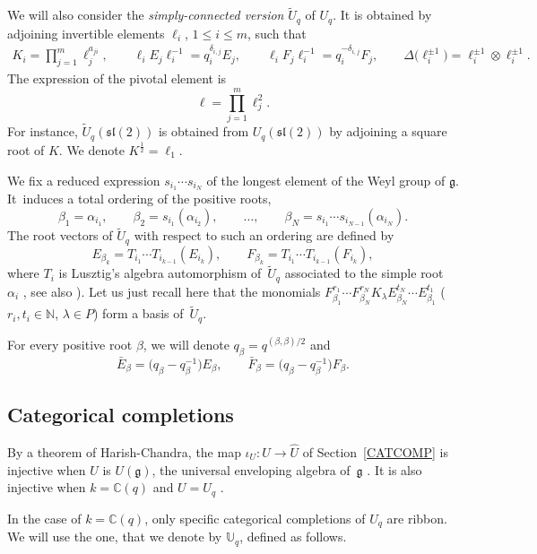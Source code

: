 \documentclass[pdftex]{sigma}%
\numberwithin{equation}{section}
\numberwithin{figure}{section}
\newcommand{\mUq}{\mathbb{U}_q}
\newcommand{\mn}{\mathbb{N}}
\begin{document}
We will also consider the {\it simply-connected version} $\tilde U_q$ of $U_q$. It is obtained by adjoining invertible elements $\ell_i$, $1\leq i \leq m$, such that
\begin{gather*}
K_i = \prod_{j=1}^m \ell_j^{a_{ji}} ,\qquad \ell_iE_j\ell_i^{-1}=q_i^{\delta_{i,j}}E_j ,\qquad \ell_iF_j\ell_i^{-1}=q_i^{-\delta_{i,j}}F_j ,\qquad \Delta\big(\ell_i^{\pm 1}\big)=\ell_i^{\pm 1}\otimes \ell_i^{\pm 1}.
\end{gather*}
The expression of the pivotal element is
\[ \ell=\prod_{j=1}^m \ell_j^2.\]
For instance, $\tilde U_q({\mathfrak{sl}}(2))$ is obtained from $U_q({\mathfrak{sl}}(2))$ by adjoining a square root of $K$. We denote $K^{\frac{1}{2}}=\ell_1$.

We fix a reduced expression $s_{i_1}\cdots s_{i_N}$ of the longest element of the Weyl group of $\mathfrak{g}$. It~indu\-ces a total ordering of the positive roots,
\[\beta_1 = \alpha_{i_1}, \qquad \beta_2 = s_{i_1}(\alpha_{i_2}), \qquad \dots, \qquad \beta_N = s_{i_1}\cdots s_{i_{N-1}}(\alpha_{i_N}).\]
The root vectors of $\tilde U_q$ with respect to such an ordering are defined by
\[E_{\beta_k} = T_{i_1}\cdots T_{i_{k-1}}(E_{i_k}) ,\qquad F_{\beta_k} = T_{i_1}\cdots T_{i_{k-1}}(F_{i_k}), \]
where $T_i$ is Lusztig's algebra automorphism of~$\tilde U_q$ associated to the simple root $\alpha_i$ \cite{Lusztig2, Lusztig}, see also \cite[Chapter~8]{CP}). Let us just recall here that the monomials $F_{\beta_1}^{r_1}\cdots F_{\beta_N}^{r_N}K_\lambda E_{\beta_N}^{t_N}\cdots E_{\beta_1}^{t_1}$ ($r_i,t_i\in \mn$, $\lambda\in P$) form a basis of~$\tilde U_q$.

For every positive root $\beta$, we will denote $q_\beta = q^{(\beta,\beta)/2}$ and
\[\bar{E}_\beta = \big(q_\beta-q_\beta^{-1}\big)E_\beta ,\qquad \bar{F}_\beta = \big(q_\beta-q_\beta^{-1}\big)F_\beta .\]

\subsection{Categorical completions} \label{catcomb} By a theorem of Harish-Chandra, the map $\iota_U\colon U\to{\hat U}$ of Section~\ref{CATCOMP} is injective when $U$ is $U({\mathfrak g})$, the universal enveloping algebra of~${\mathfrak g}$ \cite[Theorem 2.5.7]{Dix}. It is also injective when $k={\mathbb C}(q)$ and $U=U_q$ \cite[Lemma~7.1.9]{Jos}.

In the case of $k={\mathbb C}(q)$, only specific categorical completions of $U_q$ are ribbon. We will use the one, that we denote by $\mUq$, defined as follows.
\end{document}
